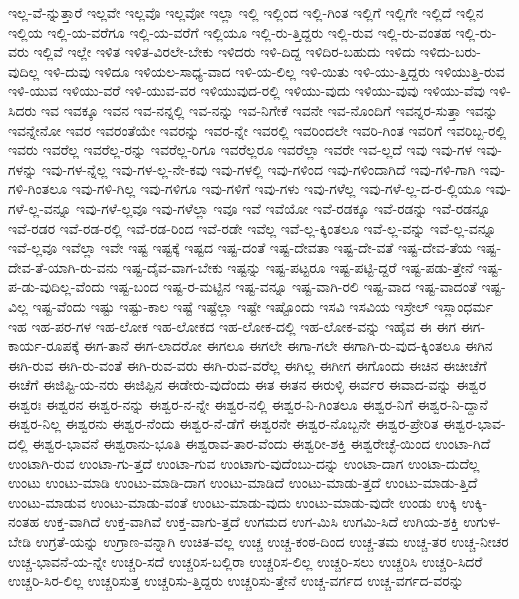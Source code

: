 {ಇಲ್ಲ-ವೆ-ನ್ನುತ್ತಾರೆ
ಇಲ್ಲವೇ
ಇಲ್ಲವೊ
ಇಲ್ಲವೋ
ಇಲ್ಲಾ
ಇಲ್ಲಿ
ಇಲ್ಲಿಂದ
ಇಲ್ಲಿ-ಗಿಂತ
ಇಲ್ಲಿಗೆ
ಇಲ್ಲಿಗೇ
ಇಲ್ಲಿದೆ
ಇಲ್ಲಿನ
ಇಲ್ಲಿಯ
ಇಲ್ಲಿ-ಯ-ವರೆಗೂ
ಇಲ್ಲಿ-ಯ-ವರೆಗೆ
ಇಲ್ಲಿಯೂ
ಇಲ್ಲಿ-ರು-ತ್ತಿದ್ದರು
ಇಲ್ಲಿ-ರುವ
ಇಲ್ಲಿ-ರು-ವಂತಹ
ಇಲ್ಲಿ-ರು-ವರು
ಇಲ್ಲಿವೆ
ಇಲ್ಲೇ
ಇಳಿತ
ಇಳಿತ-ವಿರಲೇ-ಬೇಕು
ಇಳಿದರು
ಇಳಿ-ದಿದ್ದ
ಇಳಿದಿರ-ಬಹುದು
ಇಳಿದು
ಇಳಿದು-ಬರು-ವುದಿಲ್ಲ
ಇಳಿ-ದುವು
ಇಳಿದೂ
ಇಳಿಯಲ-ಸಾಧ್ಯ-ವಾದ
ಇಳಿ-ಯ-ಲಿಲ್ಲ
ಇಳಿ-ಯಿತು
ಇಳಿ-ಯು-ತ್ತಿದ್ದರು
ಇಳಿಯುತ್ತಿ-ರುವ
ಇಳಿ-ಯುವ
ಇಳಿಯು-ವರೆ
ಇಳಿ-ಯುವ-ವರ
ಇಳಿಯುವುದ-ರಲ್ಲಿ
ಇಳಿಯು-ವುದು
ಇಳಿಯು-ವುವು
ಇಳಿಯು-ವೆವು
ಇಳಿ-ಸಿದರು
ಇವ
ಇವಕ್ಕೂ
ಇವನ
ಇವ-ನನ್ನಲ್ಲಿ
ಇವ-ನನ್ನು
ಇವ-ನಿಗೇಕೆ
ಇವನೇ
ಇವ-ನೊಂದಿಗೆ
ಇವನ್ನರ-ಸುತ್ತಾ
ಇವನ್ನು
ಇವನ್ನೇನೋ
ಇವರ
ಇವರಂತೆಯೇ
ಇವರನ್ನು
ಇವರ-ನ್ನೇ
ಇವರಲ್ಲಿ
ಇವರಿಂದಲೇ
ಇವರಿ-ಗಿಂತ
ಇವರಿಗೆ
ಇವರಿಬ್ಬ-ರಲ್ಲಿ
ಇವರು
ಇವರೆಲ್ಲ
ಇವರೆಲ್ಲ-ರನ್ನು
ಇವರೆಲ್ಲ-ರಿಗೂ
ಇವರೆಲ್ಲರೂ
ಇವರೆಲ್ಲಾ
ಇವರೇ
ಇವ-ಲ್ಲದೆ
ಇವು
ಇವು-ಗಳ
ಇವು-ಗಳನ್ನು
ಇವು-ಗಳ-ನ್ನೆಲ್ಲ
ಇವು-ಗಳ-ಲ್ಲ-ನೇ-ಕವು
ಇವು-ಗಳಲ್ಲಿ
ಇವು-ಗಳಿಂದ
ಇವು-ಗಳಿಂದಾಗಿದೆ
ಇವು-ಗಳಿ-ಗಾಗಿ
ಇವು-ಗಳಿ-ಗಿಂತಲೂ
ಇವು-ಗಳಿ-ಗಿಲ್ಲ
ಇವು-ಗಳಿಗೂ
ಇವು-ಗಳಿಗೆ
ಇವು-ಗಳು
ಇವು-ಗಳೆಲ್ಲ
ಇವು-ಗಳೆ-ಲ್ಲ-ದ-ರ-ಲ್ಲಿಯೂ
ಇವು-ಗಳೆ-ಲ್ಲ-ವನ್ನೂ
ಇವು-ಗಳೆ-ಲ್ಲವೂ
ಇವು-ಗಳೆಲ್ಲಾ
ಇವೂ
ಇವೆ
ಇವೆಯೋ
ಇವೆ-ರಡಕ್ಕೂ
ಇವೆ-ರಡನ್ನು
ಇವೆ-ರಡನ್ನೂ
ಇವೆ-ರಡರ
ಇವೆ-ರಡ-ರಲ್ಲಿ
ಇವೆ-ರಡ-ರಿಂದ
ಇವೆ-ರಡೇ
ಇವೆಲ್ಲ
ಇವೆ-ಲ್ಲ-ಕ್ಕಿಂತಲೂ
ಇವೆ-ಲ್ಲ-ವನ್ನು
ಇವೆ-ಲ್ಲ-ವನ್ನೂ
ಇವೆ-ಲ್ಲವೂ
ಇವೆಲ್ಲಾ
ಇವೇ
ಇಷ್ಟ
ಇಷ್ಟಕ್ಕೆ
ಇಷ್ಟದ
ಇಷ್ಟ-ದಂತೆ
ಇಷ್ಟ-ದೇವತಾ
ಇಷ್ಟ-ದೇ-ವತೆ
ಇಷ್ಟ-ದೇವ-ತೆಯ
ಇಷ್ಟ-ದೇವ-ತೆ-ಯಾಗಿ-ರು-ವನು
ಇಷ್ಟ-ದೈವ-ವಾಗ-ಬೇಕು
ಇಷ್ಟನ್ನು
ಇಷ್ಟ-ಪಟ್ಟರೂ
ಇಷ್ಟ-ಪಟ್ಟಿ-ದ್ದರೆ
ಇಷ್ಟ-ಪಡು-ತ್ತೇನೆ
ಇಷ್ಟ-ಪ-ಡು-ವುದಿಲ್ಲ-ವೆಂದು
ಇಷ್ಟ-ಬಂದ
ಇಷ್ಟ-ರ-ಮಟ್ಟಿನ
ಇಷ್ಟ-ವನ್ನೂ
ಇಷ್ಟ-ವಾಗಿ-ರಲಿ
ಇಷ್ಟ-ವಾದ
ಇಷ್ಟ-ವಾದಂತೆ
ಇಷ್ಟ-ವಿಲ್ಲ
ಇಷ್ಟ-ವೆಂದು
ಇಷ್ಟು
ಇಷ್ಟು-ಕಾಲ
ಇಷ್ಟೆ
ಇಷ್ಟೆಲ್ಲಾ
ಇಷ್ಟೇ
ಇಷ್ಟೊಂದು
ಇಸವಿ
ಇಸವಿಯ
ಇಸ್ರೇಲ್
ಇಸ್ಲಾಂಧರ್ಮ
ಇಹ
ಇಹ-ಪರ-ಗಳ
ಇಹ-ಲೋಕ
ಇಹ-ಲೋಕದ
ಇಹ-ಲೋಕ-ದಲ್ಲಿ
ಇಹ-ಲೋಕ-ವನ್ನು
ಇಹೈವ
ಈ
ಈಗ
ಈಗ-ಕಾರ್ಯ-ರೂಪಕ್ಕೆ
ಈಗ-ತಾನೆ
ಈಗ-ಲಾದರೋ
ಈಗಲೂ
ಈಗಲೇ
ಈಗಾ-ಗಲೇ
ಈಗಾಗಿ-ರು-ವುದ-ಕ್ಕಿಂತಲೂ
ಈಗಿನ
ಈಗಿ-ರುವ
ಈಗಿ-ರು-ವಂತೆ
ಈಗಿ-ರುವ-ವರು
ಈಗಿ-ರುವ-ವರೆಲ್ಲ
ಈಗಿಲ್ಲ
ಈಗೀಗ
ಈಗೊಂದು
ಈಚಿನ
ಈಚೀಚೆಗೆ
ಈಚೆಗೆ
ಈಜಿಪ್ಟಿ-ಯ-ನರು
ಈಜಿಪ್ಪಿನ
ಈಡೇರು-ವುದೆಂದು
ಈತ
ಈತನ
ಈರುಳ್ಳಿ
ಈರ್ವರ
ಈವಾದ-ವನ್ನು
ಈಶ್ವರ
ಈಶ್ವರಃ
ಈಶ್ವರನ
ಈಶ್ವರ-ನನ್ನು
ಈಶ್ವರ-ನ-ನ್ನೇ
ಈಶ್ವರ-ನಲ್ಲಿ
ಈಶ್ವರ-ನಿ-ಗಿಂತಲೂ
ಈಶ್ವರ-ನಿಗೆ
ಈಶ್ವರ-ನಿ-ದ್ದಾನೆ
ಈಶ್ವರ-ನಿಲ್ಲ
ಈಶ್ವರನು
ಈಶ್ವರ-ನೆಂದು
ಈಶ್ವರ-ನೆ-ಡೆಗೆ
ಈಶ್ವರನೇ
ಈಶ್ವರ-ನೊಬ್ಬನೇ
ಈಶ್ವರ-ಪ್ರೇರಿತ
ಈಶ್ವರ-ಭಾವ-ದಲ್ಲಿ
ಈಶ್ವರ-ಭಾವನೆ
ಈಶ್ವರಾನು-ಭೂತಿ
ಈಶ್ವರಾವ-ತಾರ-ವೆಂದು
ಈಶ್ವರೀ-ಶಕ್ತಿ
ಈಶ್ವರೇಚ್ಛೆ-ಯಿಂದ
ಉಂಟಾ-ಗಿದೆ
ಉಂಟಾಗಿ-ರುವ
ಉಂಟಾ-ಗು-ತ್ತದೆ
ಉಂಟಾ-ಗುವ
ಉಂಟಾಗು-ವುದೆಂಬು-ದನ್ನು
ಉಂಟಾ-ದಾಗ
ಉಂಟಾ-ದುದೆಲ್ಲ
ಉಂಟು
ಉಂಟು-ಮಾಡಿ
ಉಂಟು-ಮಾಡಿ-ದಾಗ
ಉಂಟು-ಮಾಡಿದೆ
ಉಂಟು-ಮಾಡು-ತ್ತದೆ
ಉಂಟು-ಮಾಡು-ತ್ತಿದೆ
ಉಂಟು-ಮಾಡುವ
ಉಂಟು-ಮಾಡು-ವಂತೆ
ಉಂಟು-ಮಾಡು-ವುದು
ಉಂಟು-ಮಾಡು-ವುದೇ
ಉಂಡು
ಉಕ್ಕಿ
ಉಕ್ಕಿ-ನಂತಹ
ಉಕ್ತ-ವಾಗಿದೆ
ಉಕ್ತ-ವಾಗಿವೆ
ಉಕ್ತ-ವಾಗು-ತ್ತದೆ
ಉಗಮದ
ಉಗ-ಮಿಸಿ
ಉಗಮಿ-ಸಿದೆ
ಉಗಿಯ-ಶಕ್ತಿ
ಉಗುಳ-ಬೇಡಿ
ಉಗ್ರತೆ-ಯನ್ನು
ಉಗ್ರಾಣ-ವನ್ನಾಗಿ
ಉಚಿತ-ವಲ್ಲ
ಉಚ್ಚ
ಉಚ್ಚ-ಕಂಠ-ದಿಂದ
ಉಚ್ಚ-ತಮ
ಉಚ್ಚ-ತರ
ಉಚ್ಚ-ನೀಚರ
ಉಚ್ಚ-ಭಾವನೆ-ಯ-ನ್ನೇ
ಉಚ್ಚರಿ-ಸದೆ
ಉಚ್ಚರಿಸ-ಬಲ್ಲಿರಾ
ಉಚ್ಚರಿಸ-ಲಿಲ್ಲ
ಉಚ್ಚರಿ-ಸಲು
ಉಚ್ಚರಿಸಿ
ಉಚ್ಚರಿ-ಸಿದರೆ
ಉಚ್ಚರಿ-ಸಿರ-ಲಿಲ್ಲ
ಉಚ್ಚರಿಸುತ್ತ
ಉಚ್ಚರಿಸು-ತ್ತಿದ್ದರು
ಉಚ್ಚರಿಸು-ತ್ತೇನೆ
ಉಚ್ಚ-ವರ್ಗದ
ಉಚ್ಚ-ವರ್ಗದ-ವರನ್ನು
}
